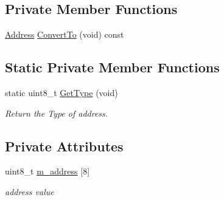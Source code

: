 \subsection*{Private Member Functions}
\begin{DoxyCompactItemize}
\item 
\hyperlink{classns3_1_1Address}{Address} \hyperlink{classns3_1_1Mac64Address_af76e8da9f5ce908481127c1b52e6a907}{Convert\+To} (void) const 
\end{DoxyCompactItemize}
\subsection*{Static Private Member Functions}
\begin{DoxyCompactItemize}
\item 
static uint8\+\_\+t \hyperlink{classns3_1_1Mac64Address_aa84ce4d8d0d5b5454778b54757abfaa3}{Get\+Type} (void)
\begin{DoxyCompactList}\small\item\em Return the Type of address. \end{DoxyCompactList}\end{DoxyCompactItemize}
\subsection*{Private Attributes}
\begin{DoxyCompactItemize}
\item 
uint8\+\_\+t \hyperlink{classns3_1_1Mac64Address_a0bb9eb08237d6b2aedb767cdec7ce590}{m\+\_\+address} \mbox{[}8\mbox{]}
\begin{DoxyCompactList}\small\item\em address value \end{DoxyCompactList}\end{DoxyCompactItemize}
